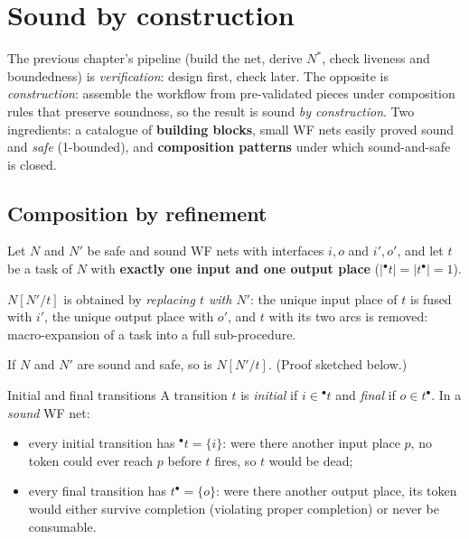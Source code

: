 \section{Sound by construction}

The previous chapter's pipeline (build the net, derive $N^*$, check liveness and boundedness) is \emph{verification}: design first, check later. The opposite is \emph{construction}: assemble the workflow from pre-validated pieces under composition rules that preserve soundness, so the result is sound \emph{by construction}. Two ingredients: a catalogue of \textbf{building blocks}, small WF nets easily proved sound and \emph{safe} (1-bounded), and \textbf{composition patterns} under which sound-and-safe is closed.

\subsection{Composition by refinement}

Let $N$ and $N'$ be safe and sound WF nets with interfaces $i, o$ and $i', o'$, and let $t$ be a task of $N$ with \textbf{exactly one input and one output place} ($|{}^\bullet t| = |t^\bullet| = 1$).

\begin{definition}[{Refinement $N[N'/t]$}]
$N[N'/t]$ is obtained by \emph{replacing $t$ with $N'$}: the unique input place of $t$ is fused with $i'$, the unique output place with $o'$, and $t$ with its two arcs is removed: macro-expansion of a task into a full sub-procedure.
\end{definition}

\begin{theorem}[Compositionality]
If $N$ and $N'$ are sound and safe, so is $N[N'/t]$. (Proof sketched below.)
\end{theorem}

\begin{definitionbox}{Initial and final transitions}
A transition $t$ is \emph{initial} if $i \in {}^\bullet t$ and \emph{final} if $o \in t^\bullet$. In a \emph{sound} WF net:
\begin{itemize}
  \item every initial transition has ${}^\bullet t = \{i\}$: were there another input place $p$, no token could ever reach $p$ before $t$ fires, so $t$ would be dead;
  \item every final transition has $t^\bullet = \{o\}$: were there another output place, its token would either survive completion (violating proper completion) or never be consumable.
\end{itemize}
\end{definitionbox}

